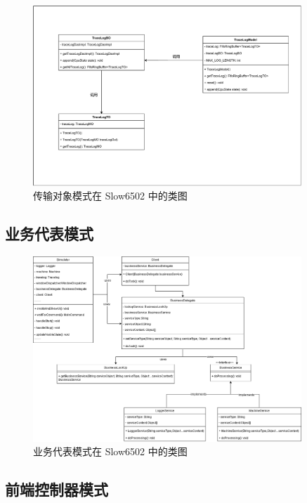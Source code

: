 \documentclass[cn,black,12pt,normal]{elegantnote}
\begin{document}
\begin{figure}[H]
  \centering
  \includegraphics[width=0.9\textwidth]{figures/传输对象模式.pdf}
  \caption{传输对象模式在 Slow6502 中的类图}
\end{figure}


\subsection{业务代表模式}

\begin{figure}[H]
  \centering
  \includegraphics[width=0.9\textwidth]{figures/业务代表模式.png}
  \caption{业务代表模式在 Slow6502 中的类图}
\end{figure}

\subsection{前端控制器模式}
\end{document}

